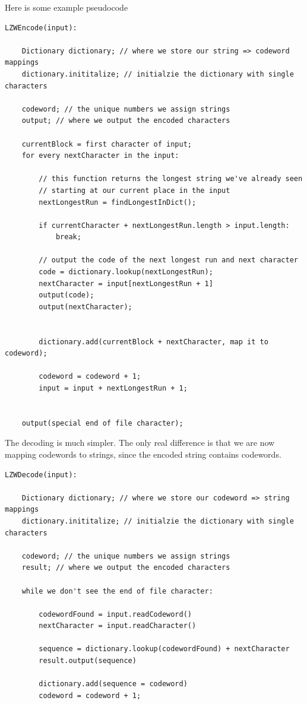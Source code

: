 \documentclass[12pt,twoside]{reedthesis}
\begin{document}
Here is some example pseudocode
\begin{verbatim}
LZWEncode(input):

    Dictionary dictionary; // where we store our string => codeword mappings
    dictionary.inititalize; // initialzie the dictionary with single characters

    codeword; // the unique numbers we assign strings
    output; // where we output the encoded characters

    currentBlock = first character of input;
    for every nextCharacter in the input:
        
        // this function returns the longest string we've already seen
        // starting at our current place in the input
        nextLongestRun = findLongestInDict();

        if currentCharacter + nextLongestRun.length > input.length:
            break;
            
        // output the code of the next longest run and next character
        code = dictionary.lookup(nextLongestRun);
        nextCharacter = input[nextLongestRun + 1]
        output(code);
        output(nextCharacter);

        
        dictionary.add(currentBlock + nextCharacter, map it to codeword);

        codeword = codeword + 1;
        input = input + nextLongestRun + 1;


    output(special end of file character);
\end{verbatim}
The decoding is much simpler. The only real difference is that we are now mapping codewords to strings, since the encoded string contains codewords.
\begin{verbatim}
LZWDecode(input):

    Dictionary dictionary; // where we store our codeword => string mappings
    dictionary.inititalize; // initialzie the dictionary with single characters

    codeword; // the unique numbers we assign strings
    result; // where we output the encoded characters

    while we don't see the end of file character:

        codewordFound = input.readCodeword()
        nextCharacter = input.readCharacter()

        sequence = dictionary.lookup(codewordFound) + nextCharacter
        result.output(sequence)

        dictionary.add(sequence = codeword)
        codeword = codeword + 1;
\end{verbatim}
\end{document}

